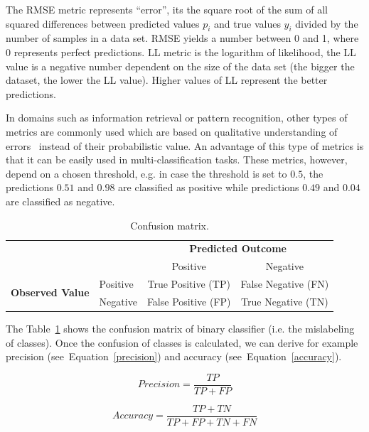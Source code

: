 The RMSE metric represents ``error'', its the square root of the sum of all squared differences between predicted values $p_i$ and true values $y_i$ divided by the number of samples in a data set. RMSE yields a number between 0 and 1, where 0 represents perfect predictions. LL metric is the logarithm of likelihood, the LL value is a negative number dependent on the size of the data set (the bigger the dataset, the lower the LL value). Higher values of LL represent the better predictions.

In domains such as information retrieval or pattern recognition, other types of metrics are commonly used which are based on qualitative understanding of errors~\cite{Pelanek2015a} instead of their probabilistic value. An advantage of this type of metrics is that it can be easily used in multi-classification tasks. These metrics, however, depend on a chosen threshold, e.g. in case the threshold is set to $0.5$, the predictions $0.51$ and $0.98$ are classified as positive while predictions $0.49$ and $0.04$ are classified as negative.

\begin{table}[htbp]
  \centering
  \caption{Confusion matrix.}
  \begin{tabular}{ l l c c }
   \toprule[\heavyrulewidth]
   & & \multicolumn{2}{c}{\textbf{Predicted Outcome}} \\
   & & Positive & Negative \\
   \midrule[\heavyrulewidth]
   \multirow{2}{5em}{\textbf{Observed Value}}
   & Positive & True Positive (TP) & False Negative (FN) \\
   & Negative & False Positive (FP) & True Negative (TN) \\
   \bottomrule[\heavyrulewidth]
  \end{tabular}
  \label{table:confusion-matrix}
\end{table}

The Table~\ref{table:confusion-matrix} shows the confusion matrix of binary classifier (i.e. the mislabeling of classes). Once the confusion of classes is calculated, we can derive for example precision (see~Equation~\ref{precision}) and accuracy (see~Equation~\ref{accuracy}).

\begin{equation} \label{precision}
  \mathit{Precision} = \frac{TP}{TP + FP}
\end{equation}

\begin{equation} \label{accuracy}
  \mathit{Accuracy} = \frac{TP + TN}{TP + FP + TN + FN}
\end{equation}

